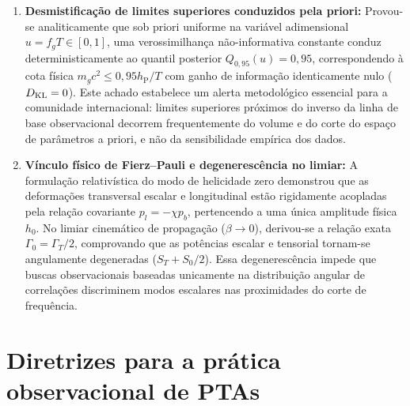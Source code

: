 \begin{enumerate}
  \item \textbf{Desmistificação de limites superiores conduzidos pela priori:} 
  Provou-se analiticamente que sob priori uniforme na variável adimensional $u = f_g T \in [0,1]$, uma verossimilhança não-informativa constante conduz deterministicamente ao quantil posterior $Q_{0{,}95}(u) = 0{,}95$, correspondendo à cota física $m_g c^2 \le 0{,}95 h_{\mathrm P}/T$ com ganho de informação identicamente nulo ($D_{\rm KL} = 0$). Este achado estabelece um alerta metodológico essencial para a comunidade internacional: limites superiores próximos do inverso da linha de base observacional decorrem frequentemente do volume e do corte do espaço de parâmetros a priori, e não da sensibilidade empírica dos dados.

  \item \textbf{Vínculo físico de Fierz--Pauli e degenerescência no limiar:} 
  A formulação relativística do modo de helicidade zero demonstrou que as deformações transversal escalar e longitudinal estão rigidamente acopladas pela relação covariante $p_l = -\chi p_b$, pertencendo a uma única amplitude física $h_0$. No limiar cinemático de propagação ($\beta \to 0$), derivou-se a relação exata $\Gamma_0 = \Gamma_T/2$, comprovando que as potências escalar e tensorial tornam-se angulamente degeneradas ($S_T + S_0/2$). Essa degenerescência impede que buscas observacionais baseadas unicamente na distribuição angular de correlações discriminem modos escalares nas proximidades do corte de frequência.
\end{enumerate}

\section{Diretrizes para a prática observacional de PTAs}

